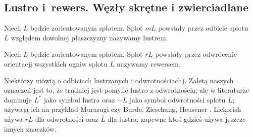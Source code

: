 
\subsection{Lustro i~rewers. Węzły skrętne i zwierciadlane}
\begin{definition}[lustro]
%
    Niech $L$ będzie zorientowanym splotem.
    Splot $mL$ powstały przez odbicie splotu $L$ względem dowolnej płaszczyzny nazywamy lustrem.
\end{definition}

\begin{definition}[rewers]
%
%
    Niech $L$ będzie zorientowanym splotem.
    Splot $rL$ powstały przez odwrócenie orientacji wszystkich ogniw splotu $L$ nazywamy rewersem.
\end{definition}

Niektórzy mówią o odbiciach lustrzanych i odwrotnościach).
Zaletą naszych oznaczeń jest to, że trudniej jest pomylić lustro z odwrotnością; ale w literaturze dominuje $L^*$ jako symbol lustra oraz $-L$ jako symbol odwrotności splotu $L$; używają ich na przykład Murasugi \cite[s. 14, 24]{murasugi96} czy Burde, Zieschang, Heusener \cite{burde14}.
Lickorish \cite[s. 4]{lickorish97} używa $r L$ dla odwrotności oraz $\overline{L}$ dla lustra; zapewne ktoś gdzieś używa jeszcze innych znaczków.


